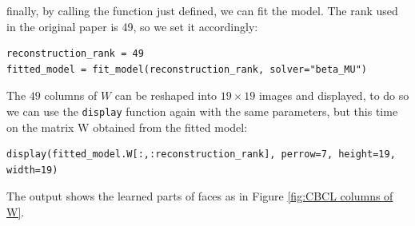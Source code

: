 finally, by calling the function just defined, we can fit the model. The rank used in the original paper \cite{Lee1999} is 49, so we set it accordingly:
\begin{lstlisting}
reconstruction_rank = 49
fitted_model = fit_model(reconstruction_rank, solver="beta_MU")
\end{lstlisting}
The $49$ columns of $W$ can be reshaped into $19 \times 19$ images and displayed, to do so we can use the \texttt{display} function again with the same parameters, but this time on the matrix W obtained from the fitted model:
\begin{lstlisting}
display(fitted_model.W[:,:reconstruction_rank], perrow=7, height=19, width=19)
\end{lstlisting}
The output shows the learned parts of faces as in Figure \ref{fig:CBCL columns of W}.
